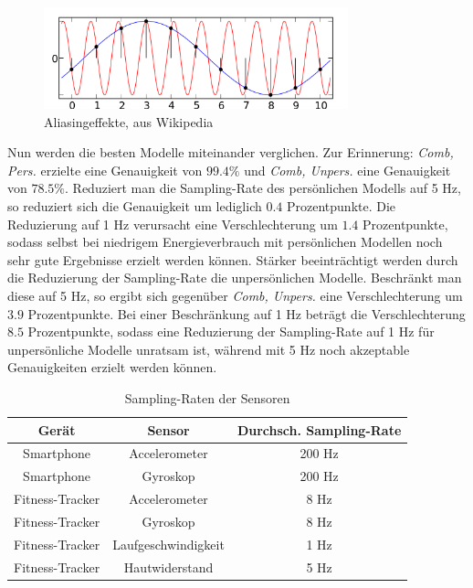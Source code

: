 \begin{figure}
\centering
\includegraphics[width=250pt]{img/aliasing}
\caption{Aliasingeffekte, aus Wikipedia \cite{Moxfyre2009Aliasing}}
\label{fig:aliasing}
\end{figure}

Nun werden die besten Modelle miteinander verglichen. Zur Erinnerung: \textit{Comb, Pers.} erzielte eine Genauigkeit von $99.4 \%$ und \textit{Comb, Unpers.} eine Genauigkeit von $78.5 \%$. Reduziert man die Sampling-Rate des persönlichen Modells auf 5 Hz, so reduziert sich die Genauigkeit um lediglich $0.4$ Prozentpunkte. Die Reduzierung auf 1 Hz verursacht eine Verschlechterung um $1.4$ Prozentpunkte, sodass selbst bei niedrigem Energieverbrauch mit persönlichen Modellen noch sehr gute Ergebnisse erzielt werden können. Stärker beeinträchtigt werden durch die Reduzierung der Sampling-Rate die unpersönlichen Modelle. Beschränkt man diese auf 5 Hz, so ergibt sich gegenüber \textit{Comb, Unpers.} eine Verschlechterung um $3.9$ Prozentpunkte. Bei einer Beschränkung auf 1 Hz beträgt die Verschlechterung $8.5$ Prozentpunkte, sodass eine Reduzierung der Sampling-Rate auf 1 Hz für unpersönliche Modelle unratsam ist, während mit 5 Hz noch akzeptable Genauigkeiten erzielt werden können.

\begin{table}
\centering
\begin{tabular}{|c|c|c|}
	\hline 
	\textbf{Gerät} & \textbf{Sensor} & \textbf{Durchsch. Sampling-Rate} \\ 
	\hline 
	Smartphone & Accelerometer & 200 Hz \\ 
	\hline 
	Smartphone & Gyroskop & 200 Hz \\ 
	\hline 
	Fitness-Tracker & Accelerometer & 8 Hz \\ 
	\hline 
	Fitness-Tracker & Gyroskop & 8 Hz \\ 
	\hline 
	Fitness-Tracker & Laufgeschwindigkeit & 1 Hz \\ 
	\hline 
	Fitness-Tracker & Hautwiderstand & 5 Hz \\ 
	\hline 
\end{tabular}
\caption{Sampling-Raten der Sensoren}
\label{tab:sampling-rates}
\end{table}

